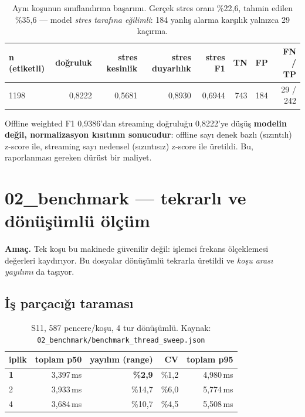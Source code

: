 \documentclass[11pt,a4paper]{report}
\newcommand{\ms}{\,ms}
\newcommand{\dosya}[1]{\texttt{\footnotesize #1}}
\begin{document}
\begin{table}[H]
\centering\small
\begin{tabular}{@{}lrrrrrrr@{}}
\toprule
\textbf{n (etiketli)} & \textbf{doğruluk} & \textbf{stres kesinlik} & \textbf{stres duyarlılık} & \textbf{stres F1} & \textbf{TN} & \textbf{FP} & \textbf{FN} / \textbf{TP} \\
\midrule
1198 & 0{,}8222 & 0{,}5681 & 0{,}8930 & 0{,}6944 & 743 & 184 & 29 / 242 \\
\bottomrule
\end{tabular}
\caption{Aynı koşunun sınıflandırma başarımı. Gerçek stres oranı \%22{,}6,
tahmin edilen \%35{,}6 --- model \emph{stres tarafına eğilimli}: 184 yanlış
alarma karşılık yalnızca 29 kaçırma.}
\end{table}

\begin{bulgu}
Offline weighted F1 0{,}9386'dan streaming doğruluğu 0{,}8222'ye düşüş
\textbf{modelin değil, normalizasyon kısıtının sonucudur}: offline sayı denek
bazlı (sızıntılı) z-score ile, streaming sayı nedensel (sızıntısız) z-score ile
üretildi. Bu, raporlanması gereken dürüst bir maliyet.
\end{bulgu}

\section{02\_benchmark --- tekrarlı ve dönüşümlü ölçüm}

\textbf{Amaç.} Tek koşu bu makinede güvenilir değil: işlemci frekans ölçeklemesi
değerleri kaydırıyor. Bu dosyalar dönüşümlü tekrarla üretildi ve \emph{koşu
arası yayılımı} da taşıyor.

\subsection{İş parçacığı taraması}

\begin{table}[H]
\centering\small
\begin{tabular}{@{}lrrrr@{}}
\toprule
\textbf{iplik} & \textbf{toplam p50} & \textbf{yayılım (range)} & \textbf{CV} & \textbf{toplam p95} \\
\midrule
\textbf{1} & 3{,}397\ms & \textbf{\%2{,}9} & \%1{,}2 & 4{,}980\ms \\
2 & 3{,}933\ms & \%14{,}7 & \%6{,}0 & 5{,}774\ms \\
4 & 3{,}684\ms & \%10{,}7 & \%4{,}5 & 5{,}508\ms \\
\bottomrule
\end{tabular}
\caption{S11, 587 pencere/koşu, 4 tur dönüşümlü.
Kaynak: \dosya{02\_benchmark/benchmark\_thread\_sweep.json}}
\end{table}
\end{document}

